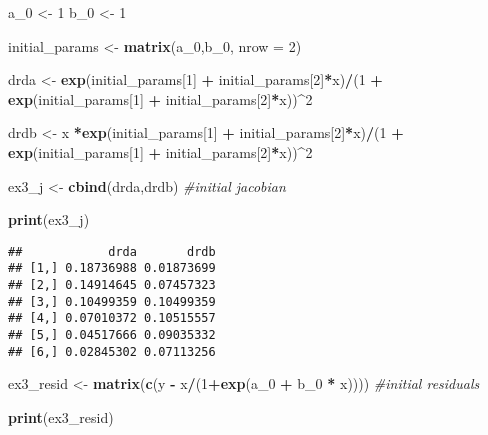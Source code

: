 \documentclass[
]{article}
\newenvironment{Shaded}{\begin{snugshade}}{\end{snugshade}}
\newcommand{\CommentTok}[1]{\textcolor[rgb]{0.56,0.35,0.01}{\textit{#1}}}
\newcommand{\DataTypeTok}[1]{\textcolor[rgb]{0.13,0.29,0.53}{#1}}
\newcommand{\DecValTok}[1]{\textcolor[rgb]{0.00,0.00,0.81}{#1}}
\newcommand{\KeywordTok}[1]{\textcolor[rgb]{0.13,0.29,0.53}{\textbf{#1}}}
\newcommand{\NormalTok}[1]{#1}
\newcommand{\OperatorTok}[1]{\textcolor[rgb]{0.81,0.36,0.00}{\textbf{#1}}}
\newcommand{\StringTok}[1]{\textcolor[rgb]{0.31,0.60,0.02}{#1}}
\begin{document}
\begin{Shaded}
\begin{Highlighting}[]
\NormalTok{a\_}\DecValTok{0}\NormalTok{ \textless{}{-}}\StringTok{ }\DecValTok{1}
\NormalTok{b\_}\DecValTok{0}\NormalTok{ \textless{}{-}}\StringTok{ }\DecValTok{1}

\NormalTok{initial\_params \textless{}{-}}\StringTok{ }\KeywordTok{matrix}\NormalTok{(a\_}\DecValTok{0}\NormalTok{,b\_}\DecValTok{0}\NormalTok{, }\DataTypeTok{nrow =} \DecValTok{2}\NormalTok{)}

\NormalTok{drda \textless{}{-}}\StringTok{ }\KeywordTok{exp}\NormalTok{(initial\_params[}\DecValTok{1}\NormalTok{] }\OperatorTok{+}\StringTok{ }\NormalTok{initial\_params[}\DecValTok{2}\NormalTok{]}\OperatorTok{*}\NormalTok{x)}\OperatorTok{/}\NormalTok{(}\DecValTok{1} \OperatorTok{+}\StringTok{ }\KeywordTok{exp}\NormalTok{(initial\_params[}\DecValTok{1}\NormalTok{] }\OperatorTok{+}\StringTok{ }\NormalTok{initial\_params[}\DecValTok{2}\NormalTok{]}\OperatorTok{*}\NormalTok{x))}\OperatorTok{\^{}}\DecValTok{2}
  
\NormalTok{drdb \textless{}{-}}\StringTok{ }\NormalTok{x }\OperatorTok{*}\KeywordTok{exp}\NormalTok{(initial\_params[}\DecValTok{1}\NormalTok{] }\OperatorTok{+}\StringTok{ }\NormalTok{initial\_params[}\DecValTok{2}\NormalTok{]}\OperatorTok{*}\NormalTok{x)}\OperatorTok{/}\NormalTok{(}\DecValTok{1} \OperatorTok{+}\StringTok{ }\KeywordTok{exp}\NormalTok{(initial\_params[}\DecValTok{1}\NormalTok{] }\OperatorTok{+}\StringTok{ }\NormalTok{initial\_params[}\DecValTok{2}\NormalTok{]}\OperatorTok{*}\NormalTok{x))}\OperatorTok{\^{}}\DecValTok{2}


\NormalTok{ex3\_j \textless{}{-}}\StringTok{ }\KeywordTok{cbind}\NormalTok{(drda,drdb) }\CommentTok{\#initial jacobian}

\KeywordTok{print}\NormalTok{(ex3\_j)}
\end{Highlighting}
\end{Shaded}

\begin{verbatim}
##            drda       drdb
## [1,] 0.18736988 0.01873699
## [2,] 0.14914645 0.07457323
## [3,] 0.10499359 0.10499359
## [4,] 0.07010372 0.10515557
## [5,] 0.04517666 0.09035332
## [6,] 0.02845302 0.07113256
\end{verbatim}

\begin{Shaded}
\begin{Highlighting}[]
\NormalTok{ex3\_resid \textless{}{-}}\StringTok{ }\KeywordTok{matrix}\NormalTok{(}\KeywordTok{c}\NormalTok{(y }\OperatorTok{{-}}\StringTok{ }\NormalTok{x}\OperatorTok{/}\NormalTok{(}\DecValTok{1}\OperatorTok{+}\KeywordTok{exp}\NormalTok{(a\_}\DecValTok{0} \OperatorTok{+}\StringTok{ }\NormalTok{b\_}\DecValTok{0} \OperatorTok{*}\StringTok{ }\NormalTok{x)))) }\CommentTok{\#initial residuals}

\KeywordTok{print}\NormalTok{(ex3\_resid)}
\end{Highlighting}
\end{Shaded}
\end{document}
